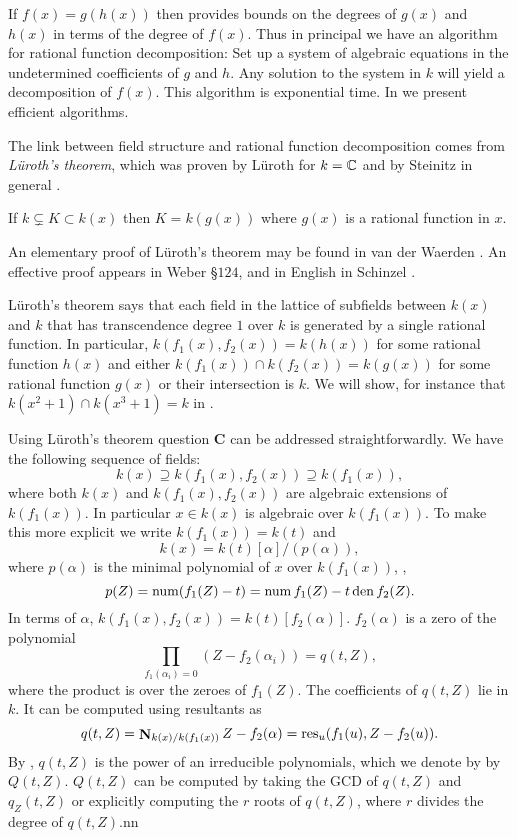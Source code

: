 If $f(x) = g(h(x))$ then  provides
bounds on the degrees of $g(x)$ and $h(x)$ in terms of the degree of
$f(x)$.  Thus in principal we have an algorithm for rational function
decomposition: Set up a system of algebraic equations in the
undetermined coefficients of $g$ and $h$.  Any solution to the system
in $k$ will yield a decomposition of $f(x)$.  This algorithm is
exponential time.  In  we
present efficient algorithms.

\medskip
The link between field structure and rational function decomposition
comes from {\em L\"uroth's theorem\/}, which was proven by L\"uroth
\cite{Luroth76} for $k = \mathbb{C}$ and by Steinitz in general
\cite{Steinitz10}.

\begin{proposition}[L\"uroth]
\label{Luroths:Prop}
If $k \varsubsetneq K \subset k(x)$ then $K = k(g(x))$ where $g(x)$ is
a rational function in $x$.
\end{proposition}

\noindent
An elementary proof of L\"uroth's theorem may be found in van der
Waerden \cite{Waerden:Algebra}.  An effective proof appears in
Weber \cite{Weber:Algebra:II} \S$124$, and in English in Schinzel
\cite{Schinzel:Polynomials}.

L\"uroth's theorem says that each field in the lattice of subfields
between $k(x)$ and $k$ that has transcendence degree $1$ over $k$
is generated by a single rational function.  In particular, $k(f_1(x),
f_2(x)) = k(h(x))$ for some rational function $h(x)$ and either
$k(f_1(x)) \cap k(f_2(x)) = k(g(x))$ for some rational function $g(x)$
or their intersection is $k$.  We will show, for instance that
$k(x^2+1)\cap k(x^3+1) = k$ in . 

Using L\"uroth's theorem question {\bf C} can be addressed
straightforwardly.  We have the following sequence of fields:
\[
k(x) \supseteq k(f_1(x), f_2(x)) \supseteq k(f_1(x)),
\]
where both $k(x)$ and $k(f_1(x), f_2(x))$ are algebraic extensions of
$k(f_1(x))$.  In particular $x \in k(x)$ is algebraic over
$k(f_1(x))$.  To make this more explicit we write $k(f_1(x)) = k(t)$
and
\[
k(x) = k(t)[\alpha]/(p(\alpha)),
\]
where $p(\alpha)$ is the minimal polynomial of $x$ over $k(f_1(x))$,
\ie,
\[
p(Z) = \mathop{\rm num}\nolimits (f_1(Z) - t) = \mathop{\rm num}\nolimits f_1(Z) - t \mathop{\rm den}\nolimits f_2(Z).
\]
In terms of $\alpha$, $k(f_1(x), f_2(x)) = k(t)[f_2(\alpha)]$.  
$f_2(\alpha)$ is a zero of the polynomial
\[
\prod_{f_1(\alpha_i) = 0} \left(Z - f_2(\alpha_i)\right) = q(t, Z),
\]
where the product is over the zeroes of $f_1(Z)$.  The coefficients of
$q(t, Z)$ lie in $k$.  It can be computed using resultants as
\[
q(t, Z) = \mathop{\mathbf{N}}\nolimits_{k(x)/k(f_1(x))} Z - f_2(\alpha) 
        = \mathop{\rm res}\nolimits_u (f_1(u), Z- f_2(u)).
\]
By , $q(t, Z)$ is the power of an irreducible
polynomials, which we denote by by $Q(t, Z)$.  $Q(t, Z)$ can be
computed by taking the GCD of $q(t, Z)$ and $q_Z(t,Z)$ or explicitly
computing the $r$\th{} roots of $q(t,Z)$, where $r$ divides the degree
of $q(t,Z)$.nn

